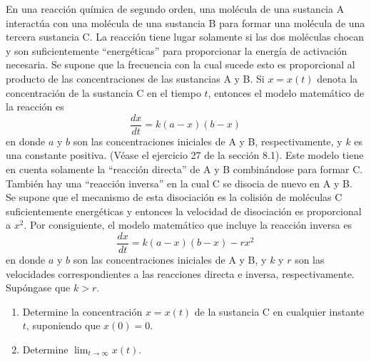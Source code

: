 \item En una reacción química de segundo orden, una molécula de una sustancia A interactúa con una molécula de una sustancia B para formar una molécula de una tercera sustancia C. La reacción tiene lugar solamente si las dos moléculas chocan y son suficientemente ``energéticas'' para proporcionar la energía de activación necesaria. Se supone que la frecuencia con la cual sucede esto es proporcional al producto de las concentraciones de las sustancias A y B. Si $x = x(t)$ denota la concentración de la sustancia C en el tiempo $t$, entonces el modelo matemático de la reacción es
    \[ \frac{dx}{dt} = k(a - x)(b - x) \]
    en donde $a$ y $b$ son las concentraciones iniciales de A y B, respectivamente, y $k$ es una constante positiva. (Véase el ejercicio 27 de la sección 8.1). Este modelo tiene en cuenta solamente la ``reacción directa'' de A y B combinándose para formar C. También hay una ``reacción inversa'' en la cual C se disocia de nuevo en A y B. Se supone que el mecanismo de esta disociación es la colisión de moléculas C suficientemente energéticas y entonces la velocidad de disociación es proporcional a $x^2$. Por consiguiente, el modelo matemático que incluye la reacción inversa es
    \[ \frac{dx}{dt} = k(a - x)(b - x) - rx^2 \]
    en donde $a$ y $b$ son las concentraciones iniciales de A y B, y $k$ y $r$ son las velocidades correspondientes a las reacciones directa e inversa, respectivamente. Supóngase que $k > r$.
    \begin{enumerate}
        \item[(a)] Determine la concentración $x = x(t)$ de la sustancia C en cualquier instante $t$, suponiendo que $x(0) = 0$.
        \item[(b)] Determine $\lim_{t\to\infty} x(t)$.
    \end{enumerate}
